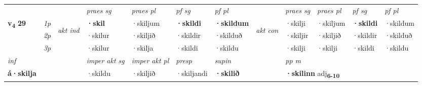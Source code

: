 \begin{longtable}[l]{X>{\footnotesize\itshape}llXXXXlXXXX}
 & &   & \textit{praes sg}  & \textit{praes pl}    & \textit{ pf sg} & \textit{pf pl} & & \textit{praes sg}  & \textit{praes pl}    & \textit{pf sg} & \textit{pf pl }  \\ \cmidrule{4-7} \cmidrule{9-12}
 \multirow{2}{*}{{{\textbf{v{\textsubscript{4}}} \Large{\textbf{29}}}}}  & 1p & \multirow{3}{*}{\begin{turn}{90}\textit{akt ind}\end{turn}} & \textbf{·skil} & ·skiljum & \textbf{·skildi} & \textbf{·skildum} & \multirow{3}{*}{\begin{turn}{90}\textit{akt con}\end{turn}} &·skilji & ·skiljum & \textbf{·skildi} & ·skildum\\*
 & 2p &  &  ·skilur  & ·skiljið & ·skildir & ·skilduð & & ·skiljir & ·skiljið & ·skildir & ·skilduð \\*
 & 3p &  & ·skilur & ·skilja & ·skildi & ·skildu & & ·skilji & ·skilji& ·skildi & ·skildu \\*
\cmidrule{4-7} \cmidrule{9-12}

   {\textit{inf}} & &  & \textit{imper akt sg} & \textit{imper akt pl}   & \textit{presp} & \textit{supin}  && \textit{pp m} \\*
  {\textbf{á\allowbreak ·skilja}} & && ·skildu  & ·skiljið   & ·skiljandi &  \textbf{·skilið}  && \multicolumn{2}{l}{\textbf{·skilinn} adj\textbf{\textsubscript{6-10}}} \\*

\midrule


\end{longtable}
